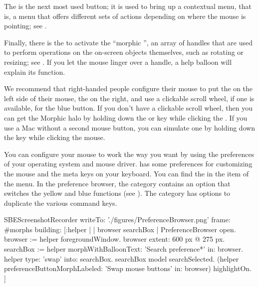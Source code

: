 \documentclass[a4paper,10pt,twoside]{book}
\begin{document}
The  is the next most used button; it is used to bring up a contextual menu, that is, a menu that offers different sets of actions depending on where the mouse is pointing; see .

\dothis{Type \ct{Time now} in the workspace.
Now click the yellow button in the workspace.
Select \emph{print it}.%
}

Finally, there is the  to activate the ``morphic '', an array of handles that are used to perform operations on the on-screen objects themselves, such as rotating or resizing; see .
If you let the mouse linger over a handle, a help balloon will explain its function.


We recommend that right-handed people configure their mouse to put the  on the left side of their mouse, the  on the right, and use a clickable scroll wheel, if one is available, for the blue button.
If you don't have a clickable scroll wheel, then you can get the Morphic halo by holding down the  or  key while clicking the .
If you use a Mac without a second mouse button, you can simulate one by holding down the \clover{} key while clicking the mouse.

You can configure your mouse to work the way you want by using the preferences of your operating system and mouse driver.
\sq has some preferences for customizing the mouse and the meta keys on your keyboard.
You can find the  in the  item of the  menu.
In the preference browser, the  category contains an option  that switches the yellow and blue functions (see ).
The  category has options to duplicate the various command keys.


\begin{ExecuteSmalltalkScript}
SBEScreenshotRecorder writeTo: './figures/PreferenceBrowser.png' frame: #morphs building: [:helper |
	| browser searchBox |
	PreferenceBrowser open.
	browser := helper foregroundWindow.
	browser extent: 600 px @ 275 px.
	searchBox := helper morphWithBalloonText: 'Search preference*' in: browser.
	helper type: 'swap' into: searchBox.
	searchBox model searchSelected.
	(helper preferenceButtonMorphLabeled: 'Swap mouse buttons' in: browser) highlightOn.
]
\end{ExecuteSmalltalkScript}
\end{document}
